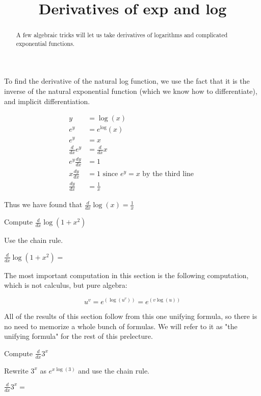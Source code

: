 \documentclass{ximera}
\title{Derivatives of exp and log}
\begin{document}
\begin{abstract}
  A few algebraic tricks will let us take derivatives of logarithms and complicated exponential functions.
\end{abstract}

\maketitle

To find the derivative of the natural log function, we use the fact that it is the inverse of the natural exponential function (which we know how to differentiate), and implicit differentiation.

\begin{align*}
y&=\log(x)\\
e^y &= e^\log(x)\\
e^y &= x\\
\frac{d}{dx} e^y &= \frac{d}{dx} x\\
e^y\frac{dy}{dx} &= 1\\
x\frac{dy}{dx} &= 1 \text{ since $e^y=x$ by the third line }\\
\frac{dy}{dx} &= \frac{1}{x}
\end{align*}

Thus we have found that $\frac{d}{dx} \log(x) = \frac{1}{x}$

\begin{question}
	Compute $\frac{d}{dx} \log(1+x^2)$
	\begin{solution}
	\begin{hint}
		Use the chain rule.
	\end{hint}
		$\frac{d}{dx} \log(1+x^2)=$
	\end{solution}
\end{question}

The most important computation in this section is the following computation, which is not  calculus, but pure algebra:

\[
	u^v = e^(\log(u^v)) = e^(v\log(u))
\]

All of the results of this section follow from this one unifying formula, so there is no need to memorize a whole bunch of formulas.   We will refer to it as "the unifying formula" for the rest of this prelecture.


\begin{question}
	Compute $\frac{d}{dx} 3^x $
	\begin{solution}
		\begin{hint}
			Rewrite $3^x$ as $e^{x\log(3)}$ and use the chain rule.
		\end{hint}
		$\frac{d}{dx} 3^x =$ \answer{log(3)*3^x} 
	\end{solution}
\end{question}
\end{document}
